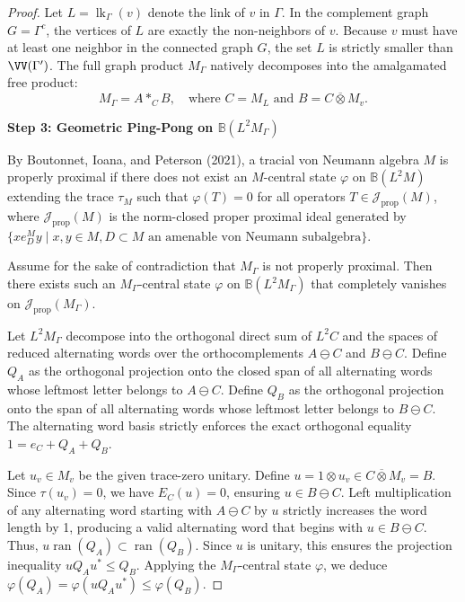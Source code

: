 \begin{proof}
Let $L = \operatorname{lk}_\Gamma(v)$ denote the link of $v$ in $\Gamma$. In the complement graph $G = \Gamma^c$, the vertices of $L$ are exactly the non-neighbors of $v$. Because $v$ must have at least one neighbor in the connected graph $G$, the set $L$ is strictly smaller than $\VV(\Gamma')$.
The full graph product $M_\Gamma$ natively decomposes into the amalgamated free product:
\[
M_\Gamma = A \ast_C B, \quad \text{where } C = M_L \text{ and } B = C \overline{\otimes} M_v.
\]

\medskip\noindent\textbf{Step 3: Geometric Ping-Pong on $\mathbb{B}(L^2M_\Gamma)$}

By Boutonnet, Ioana, and Peterson (2021), a tracial von Neumann algebra $M$ is properly proximal if there does not exist an $M$-central state $\varphi$ on $\mathbb{B}(L^2M)$ extending the trace $\tau_M$ such that $\varphi(T) = 0$ for all operators $T \in \mathcal{J}_{\mathrm{prop}}(M)$, where $\mathcal{J}_{\mathrm{prop}}(M)$ is the norm-closed proper proximal ideal generated by $\{x e_D^M y \mid x, y \in M, D \subset M \text{ an amenable von Neumann subalgebra}\}$.

Assume for the sake of contradiction that $M_\Gamma$ is not properly proximal. Then there exists such an $M_\Gamma$-central state $\varphi$ on $\mathbb{B}(L^2M_\Gamma)$ that completely vanishes on $\mathcal{J}_{\mathrm{prop}}(M_\Gamma)$.

Let $L^2M_\Gamma$ decompose into the orthogonal direct sum of $L^2C$ and the spaces of reduced alternating words over the orthocomplements $A \ominus C$ and $B \ominus C$. Define $Q_A$ as the orthogonal projection onto the closed span of all alternating words whose leftmost letter belongs to $A \ominus C$. Define $Q_B$ as the orthogonal projection onto the span of all alternating words whose leftmost letter belongs to $B \ominus C$. The alternating word basis strictly enforces the exact orthogonal equality $1 = e_C + Q_A + Q_B$.

Let $u_v \in M_v$ be the given trace-zero unitary. Define $u = 1 \otimes u_v \in C \overline{\otimes} M_v = B$. Since $\tau(u_v)=0$, we have $E_C(u)=0$, ensuring $u \in B \ominus C$. Left multiplication of any alternating word starting with $A \ominus C$ by $u$ strictly increases the word length by 1, producing a valid alternating word that begins with $u \in B \ominus C$. Thus, $u \operatorname{ran}(Q_A) \subset \operatorname{ran}(Q_B)$. Since $u$ is unitary, this ensures the projection inequality $u Q_A u^* \le Q_B$. Applying the $M_\Gamma$-central state $\varphi$, we deduce $\varphi(Q_A) = \varphi(u Q_A u^*) \le \varphi(Q_B)$.


\end{proof}
